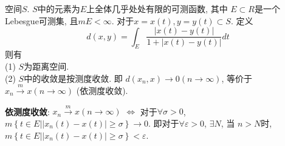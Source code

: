 \documentclass[lang=cn,10pt]{gorgeousnbook}
\numberwithin{equation}{section}%
\numberwithin{figure}{section}%
\begin{document}
\begin{exercise}
空间$S$. $S$中的元素为$E$上全体几乎处处有限的可测函数, 其中 $E\subset R$是一个Lebesgue可测集, 且$mE<\infty$. 对于$x=x(t),y= y(t)\subset S$. 定义
  \begin{equation}
    d(x,y) = \int_E{\frac{\left| x\left( t \right) -y\left( t \right) \right|}{1+\left| x\left( t \right) -y\left( t \right) \right|}dt}
    \nonumber
  \end{equation}
则有 \\
(1) $S$为距离空间. \\
(2) $S$中的收敛是按测度收敛. 即 $d(x_n,x)\rightarrow 0(n\rightarrow \infty )$, 等价于$x_n\xrightarrow{m}x\left( n\rightarrow \infty \right) $ (依测度收敛).
\end{exercise}
\begin{marker}
\textbf{依测度收敛}: 
$x_n\xrightarrow{m}x\left( n\rightarrow \infty \right)$ $\Leftrightarrow$ 对于$\forall \sigma >0$, $m\left\{t\in E\left|\left| x_n(t)-x(t)\right|\geqslant \sigma  \right.\right\}\rightarrow 0$.
即对于$\forall \varepsilon >0$, $\exists N$, 当 $n>N$时, $m \left\{t\in E\left|\left| x_n(t)-x(t)\right|\geqslant \sigma \right. \right\}<\varepsilon$.
\end{marker}
\end{document}
